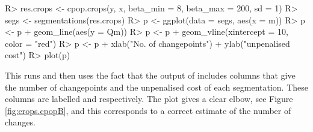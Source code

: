 \documentclass[article]{jss}
\begin{document}
\begin{CodeChunk}
\begin{CodeInput}
R> res.crops <- cpop.crops(y, x, beta_min = 8, beta_max = 200, sd = 1)
R> segs <- segmentations(res.crops)
R> p <- ggplot(data = segs, aes(x = m))
R> p <- p + geom_line(aes(y = Qm))
R> p <- p + geom_vline(xintercept = 10, color = "red")
R> p <- p + xlab("No. of changepoints") + ylab("unpenalised cost")
R> plot(p)
\end{CodeInput}
\end{CodeChunk}
This runs  and then uses the fact that the output of  includes columns that give the number of changepoints and the unpenalised cost of each segmentation. These columns are labelled  and  respectively.
The plot gives a clear elbow, see Figure \ref{fig:crops.cpopB}, and this corresponds to a correct estimate of the number of changes. %
%
%
\end{document}
